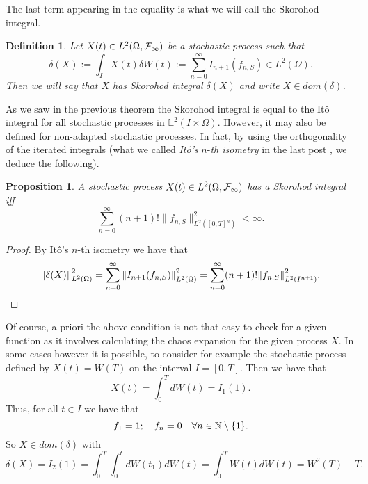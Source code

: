 \documentclass[12pt]{article}
\newtheorem{proposition}{Proposition}
\newtheorem{definition}{Definition}
\begin{document}
The last term appearing in the equality is what we will call the Skorohod integral.
\begin{definition}
	Let $X(t)\in L^2(\Omega,\mathcal{F}_\infty)$ be a  stochastic process such that
	\begin{equation*}
		\delta(X):=\int_{I} X(t)\delta W(t):=\sum_{n=0}^{\infty} I_{n+1}(f_{n,S})\in L^2(\Omega).
	\end{equation*}
	Then we will say that $X$ has Skorohod integral $\delta(X)$ and write $X\in dom(\delta)$.
\end{definition}
As we saw in the previous theorem the Skorohod integral is equal to the Itô integral for all stochastic processes in $\mathbb{L}^2(I\times\Omega)$. However, it may also be defined for non-adapted stochastic processes. In fact, by using the orthogonality of the iterated integrals (what we called \emph{Itô's} $n$-\emph{th isometry} in the last post \cite{Chaosblog}, we deduce the following).
\begin{proposition}
	A stochastic process $X(t)\in L^2(\Omega,\mathcal{F}_\infty)$ has a Skorohod integral iff
	\begin{equation*}
		\sum_{n=0}^{\infty} (n+1)!\|f_{n,S}\|^2_{L^2([0,T]^n)}<\infty.
	\end{equation*}

\end{proposition}
\begin{proof}
	By Itô's $n$-th isometry we have that
	\begin{equation*}
		\norm{\delta(X)}^2_{L^2(\Omega)}=\sum_{n=0}^{\infty}  \norm{I_{n+1}(f_{n,S})}_{L^2(\Omega)}^2=\sum_{n=0}^{\infty} (n+1)!\norm{f_{n,S}}_{L^2(I^{n+1})}^2.
	\end{equation*}
\end{proof}
Of course, a priori the above condition is not that easy to check for a given function as it involves calculating the chaos expansion for the given process $X$. In some cases however it is possible, to consider for example the stochastic process defined by $X(t)=W(T)$ on the interval $I=[0,T]$. Then we have that
\begin{equation*}
	X(t)=\int_{0}^T dW(t)=I_1(1).
\end{equation*}
Thus, for all $t\in I$ we have that
\begin{equation*}
	f_1=1;\quad f_n=0\quad\forall n \in \mathbb{N} \setminus \{1\}  .
\end{equation*}
So $X\in dom(\delta)$ with
\begin{equation*}
	\delta(X)= I_2(1)=\int_{0}^T\int_{0}^t dW(t_1)dW(t)=\int_{0}^T W(t) dW(t)= W^2(T)-T.
\end{equation*}
\end{document}
